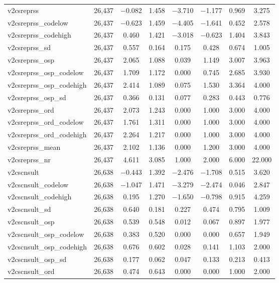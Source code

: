 \begin{table}[!htbp]
\begin{tabular}{@{\extracolsep{5pt}}lccccccc}
v2csreprss & 26,437 & $-$0.082 & 1.458 & $-$3.710 & $-$1.177 & 0.969 & 3.275 \\ 
v2csreprss\_codelow & 26,437 & $-$0.623 & 1.459 & $-$4.405 & $-$1.641 & 0.452 & 2.578 \\ 
v2csreprss\_codehigh & 26,437 & 0.460 & 1.421 & $-$3.018 & $-$0.623 & 1.404 & 3.843 \\ 
v2csreprss\_sd & 26,437 & 0.557 & 0.164 & 0.175 & 0.428 & 0.674 & 1.005 \\ 
v2csreprss\_osp & 26,437 & 2.065 & 1.088 & 0.039 & 1.149 & 3.007 & 3.963 \\ 
v2csreprss\_osp\_codelow & 26,437 & 1.709 & 1.172 & 0.000 & 0.745 & 2.685 & 3.930 \\ 
v2csreprss\_osp\_codehigh & 26,437 & 2.414 & 1.089 & 0.075 & 1.530 & 3.364 & 4.000 \\ 
v2csreprss\_osp\_sd & 26,437 & 0.366 & 0.131 & 0.077 & 0.283 & 0.443 & 0.776 \\ 
v2csreprss\_ord & 26,437 & 2.073 & 1.243 & 0.000 & 1.000 & 3.000 & 4.000 \\ 
v2csreprss\_ord\_codelow & 26,437 & 1.761 & 1.311 & 0.000 & 1.000 & 3.000 & 4.000 \\ 
v2csreprss\_ord\_codehigh & 26,437 & 2.264 & 1.217 & 0.000 & 1.000 & 3.000 & 4.000 \\ 
v2csreprss\_mean & 26,437 & 2.102 & 1.136 & 0.000 & 1.200 & 3.000 & 4.000 \\ 
v2csreprss\_nr & 26,437 & 4.611 & 3.085 & 1.000 & 2.000 & 6.000 & 22.000 \\ 
v2cscnsult & 26,638 & $-$0.443 & 1.392 & $-$2.476 & $-$1.708 & 0.515 & 3.620 \\ 
v2cscnsult\_codelow & 26,638 & $-$1.047 & 1.471 & $-$3.279 & $-$2.474 & 0.046 & 2.847 \\ 
v2cscnsult\_codehigh & 26,638 & 0.195 & 1.270 & $-$1.650 & $-$0.798 & 0.915 & 4.259 \\ 
v2cscnsult\_sd & 26,638 & 0.640 & 0.181 & 0.227 & 0.474 & 0.795 & 1.009 \\ 
v2cscnsult\_osp & 26,638 & 0.539 & 0.548 & 0.012 & 0.067 & 0.897 & 1.977 \\ 
v2cscnsult\_osp\_codelow & 26,638 & 0.383 & 0.520 & 0.000 & 0.000 & 0.657 & 1.949 \\ 
v2cscnsult\_osp\_codehigh & 26,638 & 0.676 & 0.602 & 0.028 & 0.141 & 1.103 & 2.000 \\ 
v2cscnsult\_osp\_sd & 26,638 & 0.177 & 0.062 & 0.047 & 0.133 & 0.213 & 0.413 \\ 
v2cscnsult\_ord & 26,638 & 0.474 & 0.643 & 0.000 & 0.000 & 1.000 & 2.000 \\ 

\end{tabular}
\end{table}
